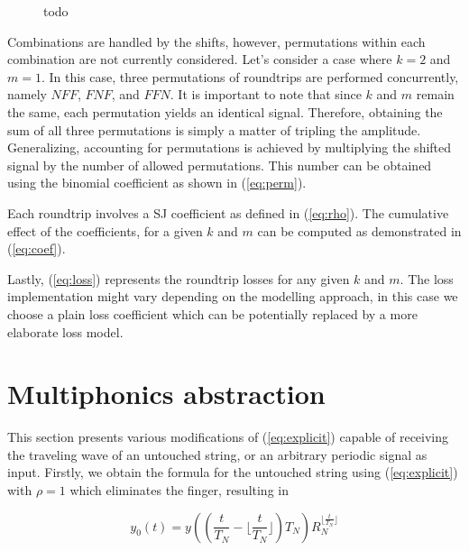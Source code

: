 \documentclass{sigchi}
\begin{document}
\begin{figure}[h]
	\centering
	\scalebox{0.75}{}
	\caption{
		todo
	}
	\label{fig:triangle}
\end{figure}

Combinations are handled by the shifts, however, permutations within each combination are not currently considered.
Let's consider a case where $k = 2$ and $m = 1$.
In this case, three permutations of roundtrips are performed concurrently, namely $NFF$, $FNF$, and $FFN$.
It is important to note that since $k$ and $m$ remain the same, each permutation yields an identical signal.
Therefore, obtaining the sum of all three permutations is simply a matter of tripling the amplitude.
Generalizing, accounting for permutations is achieved by multiplying the shifted signal by the number of allowed permutations.
This number can be obtained using the binomial coefficient as shown in (\ref{eq:perm}).

Each roundtrip involves a SJ coefficient as defined in (\ref{eq:rho}).
The cumulative effect of the coefficients, for a given $k$ and $m$ can be computed as demonstrated in (\ref{eq:coef}).

Lastly, (\ref{eq:loss}) represents the roundtrip losses for any given $k$ and $m$.
The loss implementation might vary depending on the modelling approach, in this case we choose a plain loss coefficient which can be potentially replaced by a more elaborate loss model.


\section{Multiphonics abstraction}

This section presents various modifications of (\ref{eq:explicit}) capable of receiving the traveling wave of an untouched string, or an arbitrary periodic signal as input.
Firstly, we obtain the formula for the untouched string using (\ref{eq:explicit}) with $\rho=1$ which eliminates the finger, resulting in

\begin{equation}
	y_0(t) = y((\frac{t}{T_N}-\lfloor\frac{t}{T_N}\rfloor)T_N)R_N^{\lfloor\frac{t}{T_N}\rfloor}
\end{equation}
\end{document}
